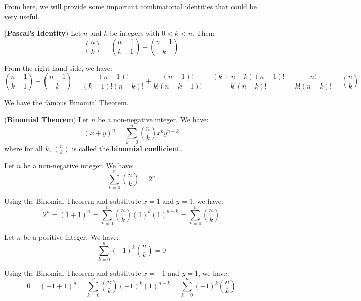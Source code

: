 \documentclass{huhtakm-template-book}
\begin{document}
\newpage
From here, we will provide some important combinatorial identities that could be very useful.
\begin{thm}(\textbf{Pascal's Identity})
	Let $n$ and $k$ be integers with $0<k<n$. Then:
	\begin{equation*}
		\binom{n}{k}=\binom{n-1}{k-1}+\binom{n-1}{k}
	\end{equation*}
\end{thm}
\begin{proofing}
	From the right-hand side, we have:
	\begin{equation*}
		\binom{n-1}{k-1}+\binom{n-1}{k}=\frac{(n-1)!}{(k-1)!(n-k)!}+\frac{(n-1)!}{k!(n-k-1)!}=\frac{(k+n-k)(n-1)!}{k!(n-k)!}=\frac{n!}{k!(n-k)!}=\binom{n}{k}
	\end{equation*}
\end{proofing}
We have the famous Binomial Theorem.
\begin{thm}(\textbf{Binomial Theorem})
	Let $n$ be a non-negative integer. We have:
	\begin{equation*}
		(x+y)^{n}=\sum_{k=0}^{n}\binom{n}{k}x^{k}y^{n-k}
	\end{equation*} 
	where for all $k$, $\binom{n}{k}$ is called the \textbf{binomial coefficient}.
\end{thm}
\begin{cor}
	Let $n$ be a non-negative integer. We have:
	\begin{equation*}
		\sum_{k=0}^{n}\binom{n}{k}=2^{n}
	\end{equation*}
\end{cor}
\begin{proofing}
	Using the Binomial Theorem and substitute $x=1$ and $y=1$, we have:
	\begin{equation*}
		2^{n}=(1+1)^{n}=\sum_{k=0}^{n}\binom{n}{k}(1)^{k}(1)^{n-k}=\sum_{k=0}^{n}\binom{n}{k}
	\end{equation*}
\end{proofing}
\begin{cor}
	Let $n$ be a positive integer. We have:
	\begin{equation*}
		\sum_{k=0}^{n}(-1)^{k}\binom{n}{k}=0
	\end{equation*}
\end{cor}
\begin{proofing}
	Using the Binomial Theorem and substitute $x=-1$ and $y=1$, we have:
	\begin{equation*}
		0=(-1+1)^{n}=\sum_{k=0}^{n}\binom{n}{k}(-1)^{k}(1)^{n-k}=\sum_{k=0}^{n}(-1)^{k}\binom{n}{k}
	\end{equation*}
\end{proofing}
\end{document}
